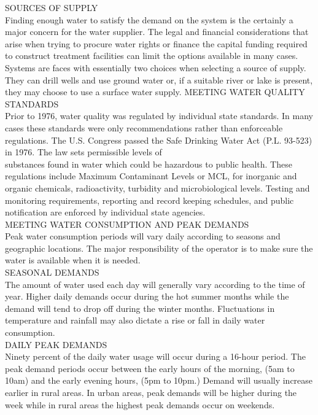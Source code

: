 \documentclass{article}
\begin{document}
SOURCES OF SUPPLY\\
Finding enough water to satisfy the demand on the system is the certainly a major concern for the water supplier. The legal and financial considerations that arise when trying to procure water rights or finance the capital funding required to construct treatment facilities can limit the options available in many cases.\\
Systems are faces with essentially two choices when selecting a source of supply. They can drill wells and use ground water or, if a suitable river or lake is present, they may choose to use a surface water supply.
MEETING WATER QUALITY STANDARDS\\
Prior to 1976, water quality was regulated by individual state standards. In many cases these standards were only recommendations rather than enforceable regulations. The U.S. Congress passed the Safe Drinking Water Act (P.L.
93-523) in 1976. The law sets permissible levels of\\
substances found in water which could be hazardous to public health. These regulations include Maximum Contaminant Levels or MCL, for inorganic and organic chemicals, radioactivity, turbidity and microbiological levels. Testing and monitoring requirements, reporting and record keeping schedules, and public notification are enforced by individual state agencies.\\
MEETING WATER CONSUMPTION AND PEAK DEMANDS\\
Peak water consumption periods will vary daily according
to seasons and geographic locations. The major
responsibility of the operator is to make sure the water is
available when it is needed.\\
SEASONAL DEMANDS\\
The amount of water used each day will generally vary according to the time of year. Higher daily demands occur during the hot summer months while the demand will tend to drop off during the winter months. Fluctuations in temperature and rainfall may also dictate a rise or fall in daily water consumption.\\
DAILY PEAK DEMANDS\\
Ninety percent of the daily water usage will occur during a 16-hour period. The peak demand periods occur between the early hours of the morning, (5am to 10am) and the early evening hours, (5pm to 10pm.) Demand will usually increase earlier in rural areas. In urban areas, peak demands will be higher during the week while in rural areas the highest peak demands occur on weekends.\\
\end{document}
